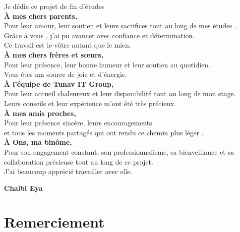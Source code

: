 \documentclass[12pt,a4paper]{report}
\begin{document}
\begin{center} 
  \large   
          Je dédie ce projet de fin d'études      \\ 
                   \vspace{0.5cm}
          \textbf{À mes chers parents,} \\ 
        Pour leur  amour, leur soutien et leurs sacrifices tout au long de mes études . \\ 
        Grâce à vous , j'ai pu avancer avec confiance et détermination. \\
           Ce travail est le vôtre autant que le mien.\\[1cm]
          \textbf{À mes chers  frères et sœurs,} \\ 
        Pour leur présence,  leur bonne humeur et leur soutien au quotidien. \\
        Vous êtes ma source de joie et d'énergie. \\ [1cm] 
        \textbf{À l'équipe de Tunav IT Group,}  \\
        Pour leur accueil chaleureux et leur disponibilité tout au long de mon stage.\\
        Leurs conseils et leur expérience m'ont été très précieux. \\[1cm]
        \textbf{À mes amis proches,} \\
        Pour leur présence sincère, leurs encouragements \\
        et tous les moments partagés qui ont rendu ce chemin plus léger .\\[1cm]
        \textbf{À  Ons, ma binôme, }\\
Pour son engagement  constant, son professionnalisme, sa bienveillance et sa collaboration précieuse tout au long de ce projet. \\
 J'ai beaucoup apprécié travailler avec elle. \\
\end{center}
\vspace{2cm}
\hfill\textbf{ Chalbi Eya  }
\vfill   

\chapter*{Remerciement}
\end{document}
